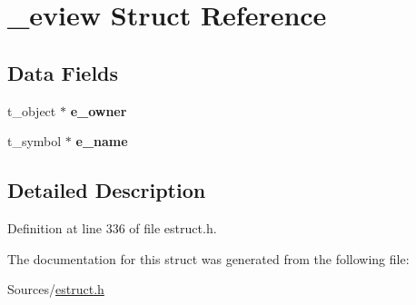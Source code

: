 \hypertarget{struct__eview}{\section{\-\_\-eview Struct Reference}
\label{struct__eview}
}
\subsection*{Data Fields}
\begin{DoxyCompactItemize}
\item 
\hypertarget{struct__eview_a2a35e154dc0053b0c8078d322ee1b5e3}{t\-\_\-object $\ast$ {\bfseries e\-\_\-owner}}\label{struct__eview_a2a35e154dc0053b0c8078d322ee1b5e3}

\item 
\hypertarget{struct__eview_a6d8c2140844c7949fe9bc0384b2129d8}{t\-\_\-symbol $\ast$ {\bfseries e\-\_\-name}}\label{struct__eview_a6d8c2140844c7949fe9bc0384b2129d8}

\end{DoxyCompactItemize}


\subsection{Detailed Description}


Definition at line 336 of file estruct.\-h.



The documentation for this struct was generated from the following file\-:\begin{DoxyCompactItemize}
\item 
Sources/\hyperlink{estruct_8h}{estruct.\-h}\end{DoxyCompactItemize}
